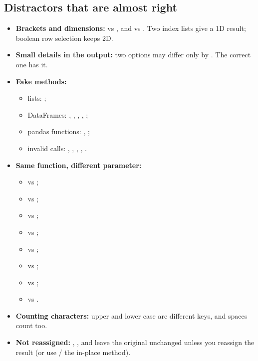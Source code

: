 \subsection{Distractors that are almost right}
\begin{itemize}
  \item \textbf{Brackets and dimensions:} \code{[20, 90]} vs \code{[[20, 90]]}, and \code{[67 58]} vs \code{[[67 58]]}. Two index lists give a 1D result; boolean row selection keeps 2D.
  \item \textbf{Small details in the output:} two  options may differ only by . The correct one has it.
  \item \textbf{Fake methods:}
  \begin{itemize}
    \item lists: ;
    \item DataFrames: , , , , ;
    \item pandas functions: , ;
    \item invalid calls: , , , , .
  \end{itemize}
  \item \textbf{Same function, different parameter:}
  \begin{itemize}
    \item {} vs ;
    \item {} vs ;
    \item {} vs ;
    \item {} vs ;
    \item {} vs ;
    \item {} vs ;
    \item {} vs ;
    \item {} vs .
  \end{itemize}
  \item \textbf{Counting characters:} upper and lower case are different keys, and spaces count too.
  \item \textbf{Not reassigned:} , ,  and  leave the original unchanged unless you reassign the result (or use  / the in-place method).
\end{itemize}

